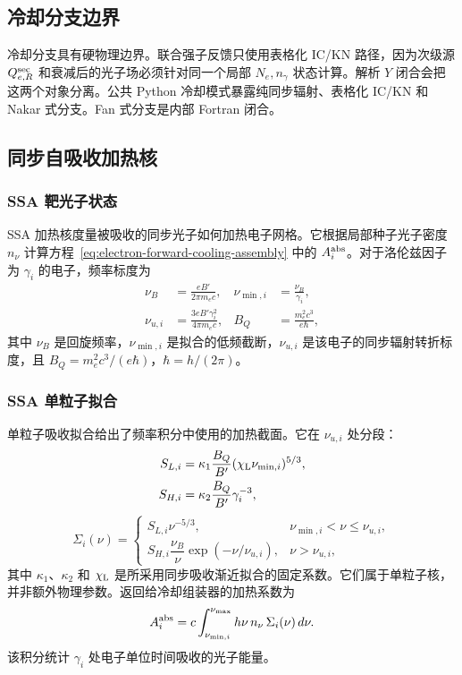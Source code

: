\documentclass[twocolumn]{aastex702}
\begin{document}
\subsection{冷却分支边界}

冷却分支具有硬物理边界。联合强子反馈只使用表格化 IC/KN 路径，因为次级源 \(Q_{e,R}^{\rm sec}\) 和衰减后的光子场必须针对同一个局部 \(N_e,n_\gamma\) 状态计算。解析 \(Y\) 闭合会把这两个对象分离。公共 Python 冷却模式暴露纯同步辐射、表格化 IC/KN 和 Nakar 式分支。Fan 式分支是内部 Fortran 闭合。

\subsection{同步自吸收加热核}

\subsubsection{SSA 靶光子状态}

SSA 加热核度量被吸收的同步光子如何加热电子网格。它根据局部种子光子密度 \(n_\nu\) 计算方程~\eqref{eq:electron-forward-cooling-assembly} 中的 \(A_i^{\rm abs}\)。对于洛伦兹因子为 \(\gamma_i\) 的电子，频率标度为
\begin{equation}
\begin{aligned}
\nu_B&=\frac{eB'}{2\pi m_e c},&
\nu_{\min,i}&=\frac{\nu_B}{\gamma_i},\\
\nu_{u,i}&=\frac{3eB'\gamma_i^2}{4\pi m_e c},&
B_Q&=\frac{m_e^2 c^3}{e\hbar},
\end{aligned}
\label{eq:ssa-frequency-scales}
\end{equation}
其中 \(\nu_B\) 是回旋频率，\(\nu_{\min,i}\) 是拟合的低频截断，\(\nu_{u,i}\) 是该电子的同步辐射转折标度，且 \(B_Q=m_e^2c^3/(e\hbar)\)，\(\hbar=h/(2\pi)\)。

\subsubsection{SSA 单粒子拟合}

单粒子吸收拟合给出了频率积分中使用的加热截面。它在 \(\nu_{u,i}\) 处分段：
\begin{equation}
\begin{aligned}
S_{L,i}&=\kappa_1\frac{B_Q}{B'}
(\chi_{\rm L}\nu_{\min,i})^{5/3},\\
S_{H,i}&=\kappa_2\frac{B_Q}{B'}\gamma_i^{-3},
\end{aligned}
\end{equation}
\begin{equation}
\Sigma_i(\nu)=
\begin{cases}
S_{L,i}\nu^{-5/3},
& \nu_{\min,i}<\nu\le\nu_{u,i},\\[2ex]
S_{H,i}\dfrac{\nu_B}{\nu}\exp(-\nu/\nu_{u,i}),
& \nu>\nu_{u,i},
\end{cases}
\end{equation}
其中 \(\kappa_1\)、\(\kappa_2\) 和 \(\chi_{\rm L}\) 是所采用同步吸收渐近拟合的固定系数。它们属于单粒子核，并非额外物理参数。返回给冷却组装器的加热系数为
\begin{equation}
A_i^{\rm abs}
=c\int_{\nu_{\min,i}}^{\nu_{\max}}
h\nu\,n_\nu\,\Sigma_i(\nu)\,d\nu .
\end{equation}
该积分统计 \(\gamma_i\) 处电子单位时间吸收的光子能量。
\end{document}
